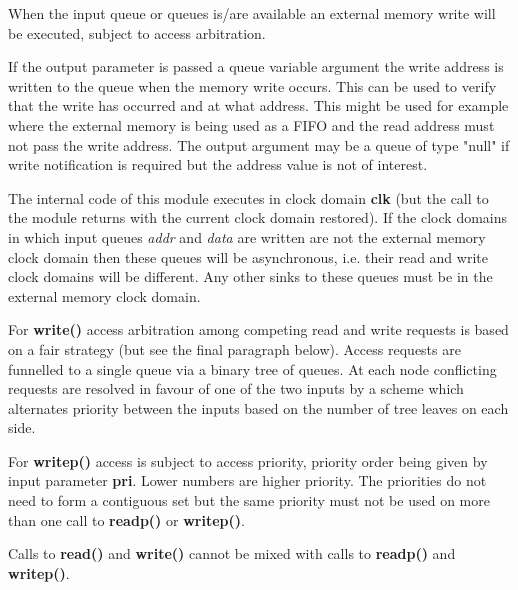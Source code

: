             When the input queue or queues is/are available an external memory
            write will be executed, subject to access arbitration.
           
            If the output parameter is passed a queue variable argument the
            write address is written to the queue when the memory write occurs.
            This can be used to verify that the write has occurred and at what
            address. This might be used for example where the external
            memory is being used as a FIFO and the read address must not
            pass the write address. The output argument may be a queue of type
            "null" if write notification is required but the address value is not
            of interest.
            
            The internal code of this module executes in clock domain {\bf clk}
            (but the call to the module returns with the current clock domain
            restored). If the clock domains in which input queues {\em addr} and
            {\em data} are written are not the external memory clock domain then
            these queues will be asynchronous, i.e. their read and write clock
            domains will be different. Any other sinks to these queues must be in
            the external memory clock domain.
            
            For {\bf write()} access arbitration among competing read and
            write requests is based on a fair strategy (but see the final
            paragraph below). Access requests are funnelled to a single queue
            via a binary tree of queues. At each node conflicting requests
            are resolved in favour of one of the two inputs by a scheme which
            alternates priority between the inputs based on the number of
            tree leaves on each side.
            
            For {\bf writep()} access is subject to access priority, priority
            order being given by input parameter {\bf pri}. Lower numbers are
            higher priority. The priorities do not need to form a contiguous set
            but the same priority must not be used on more than one call to {\bf
            readp()} or {\bf writep()}.
            
            Calls to {\bf read()} and {\bf write()} cannot be mixed with calls
            to {\bf readp()} and {\bf writep()}.


